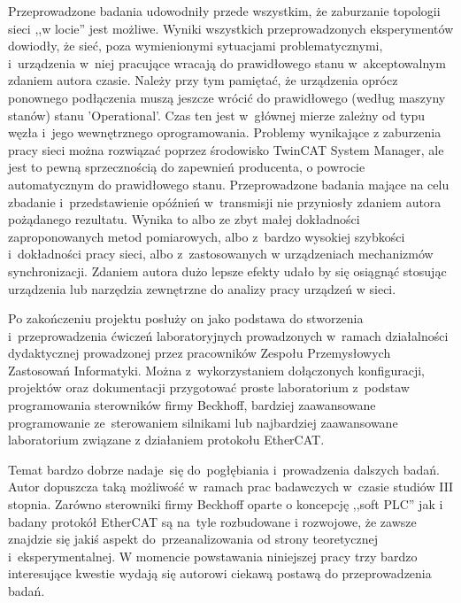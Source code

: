 Przeprowadzone badania udowodniły przede wszystkim, że zaburzanie topologii sieci ,,w locie'' jest możliwe. Wyniki wszystkich przeprowadzonych eksperymentów dowiodły, że sieć, poza wymienionymi sytuacjami problematycznymi, i~urządzenia w~niej pracujące wracają do prawidłowego stanu w~akceptowalnym zdaniem autora czasie. Należy przy tym pamiętać, że urządzenia oprócz ponownego podłączenia muszą jeszcze wrócić do prawidłowego (według maszyny stanów) stanu 'Operational'. Czas ten jest w~głównej mierze zależny od typu węzła i~jego wewnętrznego oprogramowania. Problemy wynikające z zaburzenia pracy sieci można rozwiązać poprzez środowisko TwinCAT System Manager, ale jest to pewną sprzecznością do zapewnień producenta, o powrocie automatycznym do prawidłowego stanu. Przeprowadzone badania mające na celu zbadanie i~przedstawienie opóźnień w~transmisji nie przyniosły zdaniem autora pożądanego rezultatu. Wynika to albo ze zbyt małej dokładności zaproponowanych metod pomiarowych, albo z~bardzo wysokiej szybkości i~dokładności pracy sieci, albo z~zastosowanych w urządzeniach mechanizmów synchronizacji. Zdaniem autora dużo lepsze efekty udało by się osiągnąć stosując urządzenia lub narzędzia zewnętrzne do analizy pracy urządzeń w sieci.

Po zakończeniu projektu posłuży on jako podstawa do stworzenia i~przeprowadzenia ćwiczeń laboratoryjnych prowadzonych w~ramach działalności dydaktycznej prowadzonej przez pracowników Zespołu Przemysłowych Zastosowań Informatyki. Można z~wykorzystaniem dołączonych konfiguracji, projektów oraz dokumentacji przygotować proste laboratorium z~podstaw programowania sterowników firmy Beckhoff, bardziej zaawansowane programowanie ze~sterowaniem silnikami lub najbardziej zaawansowane laboratorium związane z działaniem protokołu EtherCAT.

Temat bardzo dobrze nadaje~się do~pogłębiania i~prowadzenia dalszych badań. Autor dopuszcza taką możliwość w~ramach prac badawczych w~czasie studiów III stopnia. Zarówno sterowniki firmy Beckhoff oparte o koncepcję ,,soft PLC'' jak i badany protokół EtherCAT są na~tyle rozbudowane i rozwojowe, że zawsze znajdzie się jakiś aspekt do~przeanalizowania od strony teoretycznej i~eksperymentalnej. W momencie powstawania niniejszej pracy trzy bardzo interesujące kwestie wydają się autorowi ciekawą postawą do przeprowadzenia badań.

